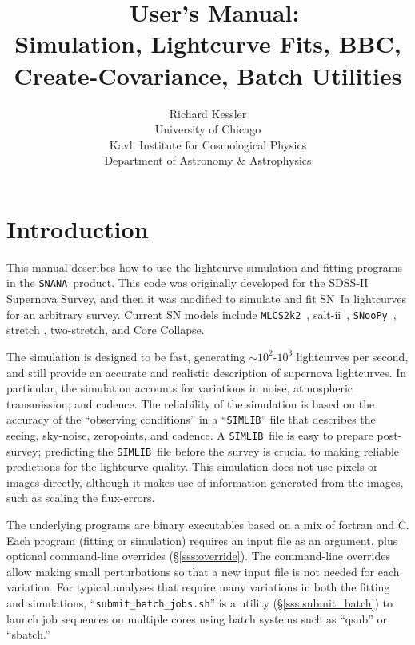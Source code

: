 \documentclass[12pt]{article}
\title{ \snana\ User's Manual: \\ 
         Simulation, Lightcurve Fits, BBC, 
         Create-Covariance, Batch Utilities}
\author{Richard Kessler \\ University of Chicago \\ 
    Kavli Institute for Cosmological Physics \\
    Department of Astronomy \& Astrophysics }
\newcommand{\mlcs}{{\tt MLCS2k2}}
\newcommand{\SALTII}{{\sc salt-ii}}
\newcommand{\snoopy}{{\tt SNooPy}}
\newcommand{\snana}{{\tt SNANA}}
\newcommand{\simlib}{{\tt SIMLIB}}
\newcommand{\trans}{transmission}
\newcommand{\submit}{\tt submit\_batch\_jobs.sh}
\begin{document}
\maketitle
\tableofcontents
\clearpage


   \section{Introduction}
   \label{sec:intro}

This manual describes how to use the lightcurve simulation 
and fitting programs in the \snana\ product. This code was 
originally developed for the SDSS-II Supernova Survey, 
and then it was  modified to simulate and fit 
SN~Ia lightcurves for an arbitrary survey.
Current SN models include 
\mlcs\ \cite{JRK07}, 
\SALTII\ \cite{Guy07},
\snoopy\ \cite{Burns11},
stretch \cite{Gold01}, 
two-stretch\cite{Hayden09}, 
  and
Core Collapse\cite{K10_challenge}.


The simulation is designed to be fast, generating $\sim 10^2$-$10^3$
lightcurves per second, and still provide an accurate and
realistic description of supernova lightcurves.
In particular, the simulation accounts for variations in
noise, atmospheric \trans, and cadence.
The reliability of the simulation is based on the accuracy
of the ``observing conditions''  in a ``{\simlib}'' file that 
describes the seeing, sky-noise, zeropoints, and cadence.
A \simlib\ file is easy to prepare post-survey;
predicting the \simlib\ file before the survey is crucial
to making reliable predictions for the lightcurve quality.
This simulation does not use pixels or images directly,
although it makes use of information generated from the images,
such as scaling the flux-errors.


The underlying programs are binary executables based on
a mix of fortran and C. Each program (fitting or simulation)
requires an input file as an argument, plus optional command-line
overrides (\S\ref{sss:override}).
The command-line overrides allow making small perturbations
so that a new input file is not needed for each variation.
For typical analyses that require many variations in both
the fitting and simulations, 
``{\submit}'' is a utility (\S\ref{sss:submit_batch})
to launch job sequences on multiple cores using batch systems 
such as ``qsub'' or ``sbatch.'' 
\end{document}
